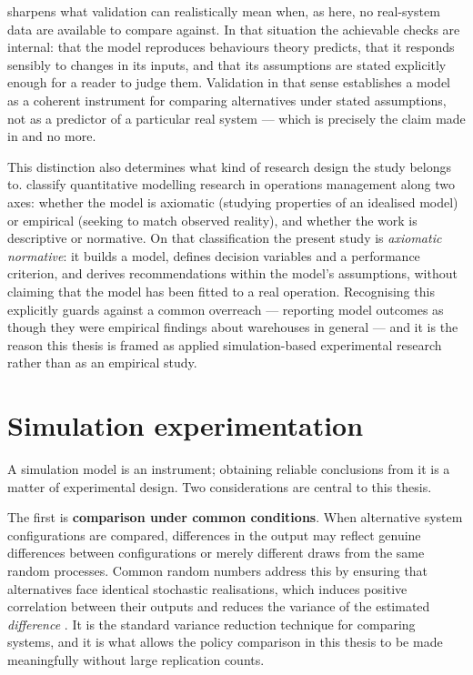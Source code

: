 \citet{kleijnen1995} sharpens what validation can realistically mean when, as here, no
real-system data are available to compare against. In that situation the achievable checks are
internal: that the model reproduces behaviours theory predicts, that it responds sensibly to
changes in its inputs, and that its assumptions are stated explicitly enough for a reader to
judge them. Validation in that sense establishes a model as a coherent instrument for comparing
alternatives under stated assumptions, not as a predictor of a particular real system --- which
is precisely the claim made in  and no more.

This distinction also determines what kind of research design the study belongs to.
\citet{bertrand2002} classify quantitative modelling research in operations management along two
axes: whether the model is axiomatic (studying properties of an idealised model) or empirical
(seeking to match observed reality), and whether the work is descriptive or normative. On that
classification the present study is \emph{axiomatic normative}: it builds a model, defines
decision variables and a performance criterion, and derives recommendations within the model's
assumptions, without claiming that the model has been fitted to a real operation. Recognising
this explicitly guards against a common overreach --- reporting model outcomes as though they
were empirical findings about warehouses in general --- and it is the reason this thesis is
framed as applied simulation-based experimental research rather than as an empirical study.

\section{Simulation experimentation}
\label{sec:lit-experimentation}

A simulation model is an instrument; obtaining reliable conclusions from it is a matter of
experimental design. Two considerations are central to this thesis.

The first is \textbf{comparison under common conditions}. When alternative system
configurations are compared, differences in the output may reflect genuine differences between
configurations or merely different draws from the same random processes. Common random numbers
address this by ensuring that alternatives face identical stochastic realisations, which
induces positive correlation between their outputs and reduces the variance of the estimated
\emph{difference} \citep{law2015}. It is the standard variance reduction technique for
comparing systems, and it is what allows the policy comparison in this thesis to be made
meaningfully without large replication counts.

